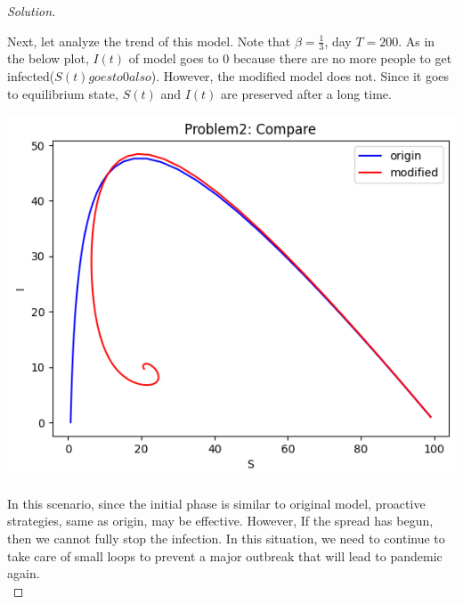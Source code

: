 \begin{proof} [Solution]
\begin{center}
 		\end{center}
 		Next, let analyze the trend of this model. Note that $\beta=\frac{1}{3}$, day $T = 200$. As in the below plot, $I(t)$ of model goes to 0 because there are no more people to get infected($S(t) goes to 0 also$). However, the modified model does not. Since it goes to equilibrium state, $S(t)$ and $I(t)$ are preserved after a long time.
 		\begin{center}
 			\includegraphics[scale=0.7]{Problem2_compare.png}
 		\end{center}
 		In this scenario, since the initial phase is similar to original model, proactive strategies, same as origin, may be effective. However, If the spread has begun, then we cannot fully stop the infection. In this situation, we need to continue to take care of small loops to prevent a major outbreak that will lead to pandemic again.\\
 		
	\end{proof}